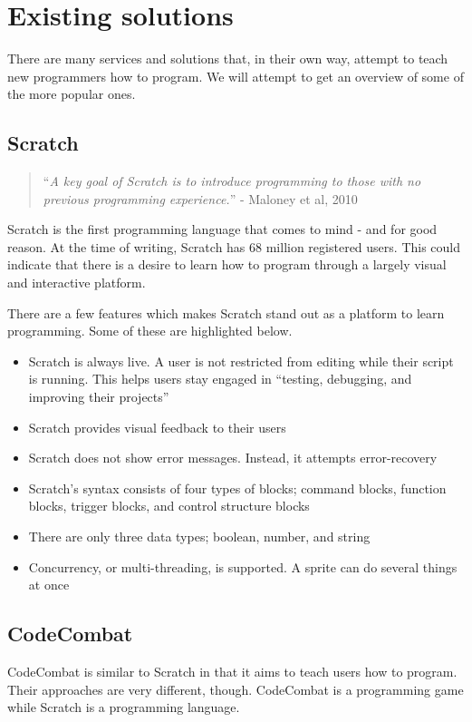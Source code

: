 \section{Existing solutions}\label{sec:existing_solutions}
There are many services and solutions that, in their own way, attempt to teach new programmers how to program.
We will attempt to get an overview of some of the more popular ones.

\subsection{Scratch}\label{ScratchSection}
\begin{quote}
    ``\emph{A key goal of Scratch is to introduce programming to those with no previous programming experience.}'' - Maloney et al, 2010\cite{maloneyScratchProgrammingLanguage2010}
\end{quote}

Scratch\cite{ScratchImagineProgram} is the first programming language that comes to mind - and for good reason. At the time of writing, Scratch has 68 million registered users\cite{ScratchImagineProgramStatistics}. This could indicate that there is a desire to learn how to program through a largely visual and interactive platform.

There are a few features which makes Scratch stand out as a platform to learn programming. Some of these are highlighted below.
\begin{itemize}
    \item Scratch is always live. A user is not restricted from editing while their script is running. This helps users stay engaged in ``testing, debugging, and improving their projects''
    \item Scratch provides visual feedback to their users
    \item Scratch does not show error messages. Instead, it attempts error-recovery
    \item Scratch's syntax consists of four types of blocks; command blocks, function blocks, trigger blocks, and control structure blocks
    \item There are only three data types; boolean, number, and string
    \item Concurrency, or multi-threading, is supported. A sprite can do several things at once
\end{itemize}\cite{maloneyScratchProgrammingLanguage2010}

\subsection{CodeCombat}\label{CodeCombatSection}
CodeCombat is similar to Scratch in that it aims to teach users how to program.
Their approaches are very different, though. CodeCombat is a programming game while Scratch is a programming language.

